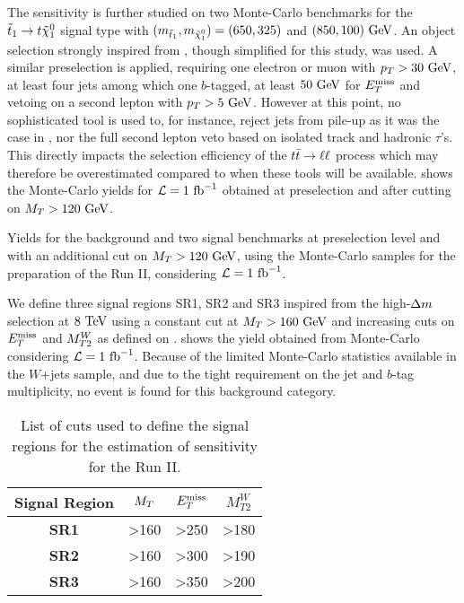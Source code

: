     The sensitivity is further studied on two Monte-Carlo benchmarks for the
    $\tilde{t}_1 \rightarrow t \tilde{\chi}_1^0$ signal type with $(m_{\tilde{t}_1},
    m_{\tilde{\chi}_1^0}) = (650,325)$ and $(850,100)~\text{GeV}$. An object selection
    strongly inspired from ,
    though simplified for this study, was used. A similar preselection is
    applied, requiring one electron or muon with $p_T > 30~\text{GeV}$, at least four
    jets among which one $b$-tagged, at least $50~\text{GeV}$ for $E_T^\text{miss}$ and vetoing on
    a second lepton with $p_T > 5~\text{GeV}$. However at this point, no sophisticated
    tool is used to, for instance, reject jets from pile-up as it was the case
    in , nor the full second lepton veto based on
    isolated track and hadronic $\tau$'s. This directly impacts the selection
    efficiency of the $t\bar{t} \rightarrow \ell \ell$ process which may therefore be
    overestimated compared to when these tools will be available.
     shows the Monte-Carlo yields for
    $\mathcal{L} = 1~\text{fb}^{-1}$ obtained at preselection and after cutting on $M_T >
    120~\text{GeV}$.

    \begin{table}[h!]
        \centering
        
        \caption{Yields for the background and two signal benchmarks at
        preselection level and with an additional cut on $M_T > 120~\text{GeV}$, using
        the Monte-Carlo samples for the preparation of the Run II, considering
        $\mathcal{L} = 1~\text{fb}^{-1}$. \label{tab:phys14Preselection}}
    \end{table}

    We define three signal regions SR1, SR2 and SR3 inspired from the
    high-$\Delta m$ selection at $8~\text{TeV}$ using a constant cut at $M_T > 160~\text{GeV}$
    and increasing cuts on $E_T^\text{miss}$ and $M_{T2}^W$ as defined on
    .   shows the yield
    obtained from Monte-Carlo considering $\mathcal{L} = 1~\text{fb}^{-1}$. Because of
    the limited Monte-Carlo statistics available in the $W$+jets sample, and due
    to the tight requirement on the jet and $b$-tag multiplicity, no event is
    found for this background category.

    \begin{table}[h!]
        \centering
        \begin{tabular}{|c|ccc|}
            \hline
            \textbf{Signal Region} & $M_T$ & $E_T^\text{miss}$ & $M_{T2}^W$ \\
            \hline
            \textbf{SR1}           & >160  & >250 & >180 \\
            \textbf{SR2}           & >160  & >300 & >190 \\
            \textbf{SR3}           & >160  & >350 & >200 \\
            \hline
        \end{tabular}
        \caption{List of cuts used to define the signal regions for the
        estimation of sensitivity for the Run II. \label{tab:phys14Cuts}}
    \end{table}

